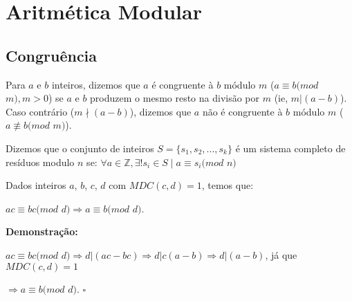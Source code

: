 
\chapter{Aritmética Modular} %

\label{Chapter2} %


\section{Congruência}

\begin{definition}
Para $a$ e $b$ inteiros, dizemos que $a$ é congruente à $b$ módulo $m$ ($a \equiv b (mod$ $m), m > 0$) 
se $a$ e $b$ produzem o mesmo resto na divisão por $m$ (ie, $m|(a-b)$).
Caso contrário ($m\nmid (a-b)$), dizemos que $a$ não é congruente à $b$ módulo $m$ ($a \not\equiv b (mod $ $m)$).
\\
\end{definition}


\begin{definition}
Dizemos que o conjunto de inteiros $S = \{s_1, s_2, ..., s_k\}$ é um sistema completo de resíduos modulo $n$ se:
$\forall a \in \mathbb{Z}, \exists! s_i \in S \mid a \equiv s_i (mod$ $n)$
\end{definition}


\begin{proposition}\label{corolario_implicacao_mdc}
Dados inteiros $a$, $b$, $c$, $d$ com $MDC(c,d)=1$, temos que: 

$ac \equiv bc (mod$ $d) \Rightarrow a \equiv b (mod$ $d)$.
\end{proposition}
\textbf{Demonstração:}

$ac \equiv bc (mod$ $d) \Rightarrow d|(ac-bc) \Rightarrow d|c(a-b) \Rightarrow d|(a-b)$, já que $MDC(c,d)=1$

$\Rightarrow a \equiv b (mod$ $d)$. $\square$
\\


